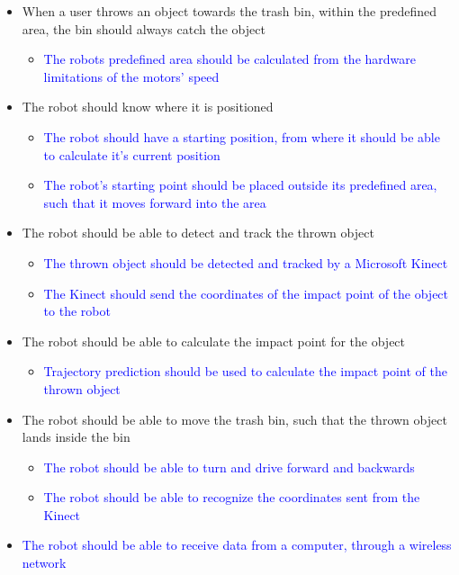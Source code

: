 \begin{itemize}
\item When a user throws an object towards the trash bin, within the predefined area, the bin should always catch the object
\begin{itemize}
\item \textcolor{blue}{The robots predefined area should be calculated from the hardware limitations of the motors’ speed}
\end{itemize}
\item The robot should know where it is positioned
\begin{itemize}
\item \textcolor{blue}{The robot should have a starting position, from where it should be able to calculate it's current position }
\item \textcolor{blue}{The robot's starting point should be placed outside its predefined area, such that it moves forward into the area}
\end{itemize}
\item The robot should be able to detect and track the thrown object
\begin{itemize}
\item \textcolor{blue}{The thrown object should be detected and tracked by a Microsoft Kinect}
\item \textcolor{blue}{The Kinect should send the coordinates of the impact point of the object to the robot}
\end{itemize}
\item The robot should be able to calculate the impact point for the object
\begin{itemize}
\item \textcolor{blue}{Trajectory prediction should be used to calculate the impact point of the thrown object}
\end{itemize}
\item The robot should be able to move the trash bin, such that the thrown object lands inside the bin
\begin{itemize}
\item \textcolor{blue}{The robot should be able to turn and drive forward and backwards}
\item \textcolor{blue}{The robot should be able to recognize the coordinates sent from the Kinect}
\end{itemize}
\item \textcolor{blue}{The robot should be able to receive data from a computer, through a wireless network}
\end{itemize}